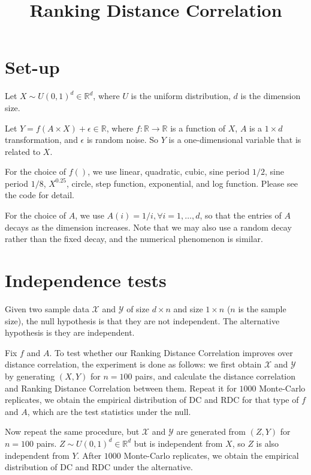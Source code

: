 \documentclass[review]{elsarticle}
\begin{document}
\begin{frontmatter}
\title{Ranking Distance Correlation}

\end{frontmatter}

\section{Set-up}
Let $X \sim U(0,1)^{d} \in \mathbb{R}^{d}$, where $U$ is the uniform distribution, $d$ is the dimension size. 

Let $Y=f(A \times X) + \epsilon \in \mathbb{R}$, where $f: \mathbb{R} \rightarrow \mathbb{R}$ is a function of $X$, $A$ is a $1 \times d$ transformation, and $\epsilon$ is random noise. So $Y$ is a one-dimensional variable that is related to $X$.

For the choice of $f()$, we use linear, quadratic, cubic, sine period $1/2$, sine period $1/8$, $X^{0.25}$, circle, step function, exponential, and log function. Please see the code for detail. 

For the choice of $A$, we use $A(i)=1/i, \forall i=1,\ldots,d$, so that the entries of $A$ decays as the dimension increases. Note that we may also use a random decay rather than the fixed decay, and the numerical phenomenon is similar.

\section{Independence tests}
Given two sample data $\mathcal{X}$ and $\mathcal{Y}$ of size $d \times n$ and size $1 \times n$ ($n$ is the sample size), the null hypothesis is that they are not independent. The alternative hypothesis is they are independent.

Fix $f$ and $A$. To test whether our Ranking Distance Correlation improves over distance correlation, the experiment is done as follows: we first obtain $\mathcal{X}$ and $\mathcal{Y}$ by generating $(X,Y)$ for $n=100$ pairs, and calculate the distance correlation and Ranking Distance Correlation between them. Repeat it for $1000$ Monte-Carlo replicates, we obtain the empirical distribution of DC and RDC for that type of $f$ and $A$, which are the test statistics under the null.

Now repeat the same procedure, but $\mathcal{X}$ and $\mathcal{Y}$ are generated from $(Z,Y)$ for $n=100$ pairs. $Z \sim U(0,1)^{d} \in \mathbb{R}^{d}$ but is independent from $X$, so $Z$ is also independent from $Y$. After $1000$ Monte-Carlo replicates, we obtain the empirical distribution of DC and RDC under the alternative.
\end{document}
